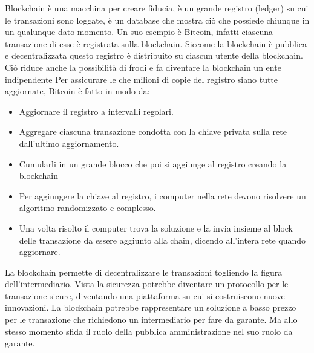 \documentclass[a4page, 11pt]{article}
\begin{document}

Blockchain è una macchina per creare fiducia, è un grande registro (ledger) su cui le transazioni sono loggate, è un database che mostra ciò che possiede chiunque in un qualunque dato momento. Un suo esempio è Bitcoin, infatti ciascuna transazione di esse è registrata sulla blockchain. Siccome la blockchain è pubblica e decentralizzata questo registro è distribuito su ciascun utente della blockchain. Ciò riduce anche la possibilità di frodi e fa diventare la blockchain un ente indipendente
Per assicurare le che milioni di copie del registro siano tutte aggiornate, Bitcoin è fatto in modo da:
\begin{itemize}
	\item Aggiornare il registro a intervalli regolari.
	\item Aggregare ciascuna transazione condotta con la chiave privata sulla rete dall’ultimo aggiornamento.
	\item Cumularli in un grande blocco che poi si aggiunge al registro creando la blockchain
	\item Per aggiungere la chiave al registro, i computer nella rete devono risolvere un algoritmo randomizzato e complesso.
	\item Una volta risolto il computer trova la soluzione e la invia insieme al block delle transazione da essere aggiunto alla chain, dicendo all’intera rete quando aggiornare.
\end{itemize}
La blockchain permette di decentralizzare le transazioni togliendo la figura dell’intermediario.
Vista la sicurezza potrebbe diventare un protocollo per le transazione sicure, diventando una piattaforma su cui si costruiscono nuove innovazioni. La blockchain potrebbe rappresentare un soluzione a basso prezzo per le transazione che richiedono un intermediario per fare da garante. Ma allo stesso momento sfida il ruolo della pubblica amministrazione nel suo ruolo da garante.
\end{document}
